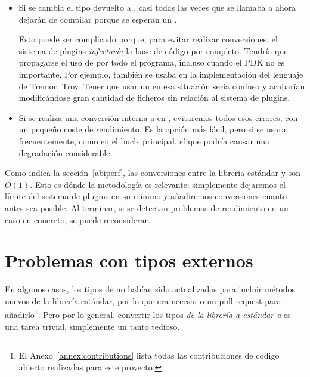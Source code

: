 \begin{itemize}
    \item Si se cambia el tipo devuelto a , casi todas las veces
        que se llamaba a  ahora dejarán de compilar porque se
        esperan un .

        Esto puede ser complicado porque, para evitar realizar conversiones, el
        sistema de plugins \emph{infectaría} la base de código por completo.
        Tendría que propagarse el uso de  por todo el programa,
        incluso cuando el PDK no es importante. Por ejemplo, 
        también se usaba en la implementación del lenguaje de Tremor, Troy.
        Tener que usar un  en esa situación sería confuso y
        acabarían modificándose gran cantidad de ficheros sin relación al
        sistema de plugins.

    \item Si se realiza una conversión interna a  en
        , evitaremos todos esos errores, con un pequeño coste de
        rendimiento. Es la opción más fácil, pero si  se
        usara frecuentemente, como en el bucle principal, sí que podría causar
        una degradación considerable.

\end{itemize}

Como indica la sección~\ref{abiperf}, las conversiones entre la librería
estándar y \abistable son $O(1)$. Esto es dónde la metodología \work es
relevante: simplemente dejaremos el límite del sistema de plugins en su mínimo y
añadiremos conversiones cuanto antes sea posible. Al terminar, si se detectan
problemas de rendimiento en un caso en concreto, se puede reconsiderar.

\section{Problemas con tipos externos}\label{sec:abi_ext}

En algunos casos, los tipos de \abistable no habían sido actualizados para
incluir métodos nuevos de la librería estándar, por lo que era necesario un pull
request para añadirlo\footnote{El Anexo~\ref{annex:contributions} lista todas
las contribuciones de código abierto realizadas para este proyecto.}. Pero por
lo general, convertir los tipos \emph{de la librería a estándar a \abistable} es
una tarea trivial, simplemente un tanto tedioso.

